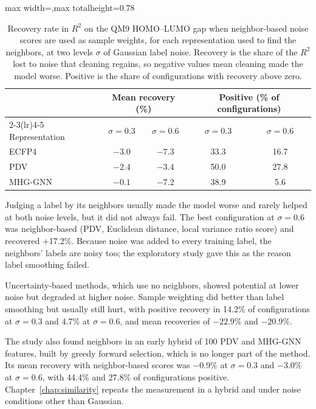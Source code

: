 \begin{table}[htbp]
\centering
\begin{adjustbox}{max width=\textwidth,max totalheight=0.78\textheight}
\begin{tabular}{lcccc}
\toprule
 & \multicolumn{2}{c}{Mean recovery (\%)} & \multicolumn{2}{c}{Positive (\% of configurations)} \\
\cmidrule(lr){2-3}\cmidrule(lr){4-5}
Representation & $\sigma = 0.3$ & $\sigma = 0.6$ & $\sigma = 0.3$ & $\sigma = 0.6$ \\
\midrule
ECFP4   & $-3.0$ & $-7.3$ & 33.3 & 16.7 \\
PDV     & $-2.4$ & $-3.4$ & 50.0 & 27.8 \\
MHG-GNN & $-0.1$ & $-7.2$ & 38.9 & 5.6 \\
\bottomrule
\end{tabular}
\end{adjustbox}
\caption[Recovery with neighbor-based sample weights by representation.]{Recovery rate in $R^2$ on the QM9 HOMO--LUMO gap when neighbor-based noise scores are used as sample weights, for each representation used to find the neighbors, at two levels $\sigma$ of Gaussian label noise. Recovery is the share of the $R^2$ lost to noise that cleaning regains, so negative values mean cleaning made the model worse. Positive is the share of configurations with recovery above zero.}
\label{tab:code_input_neighbor_recovery}
\end{table}

Judging a label by its neighbors usually made the model worse and rarely helped at both noise levels, but it did not always fail. The best configuration at $\sigma = 0.6$ was neighbor-based (PDV, Euclidean distance, local variance ratio score) and recovered +17.2\%. Because noise was added to every training label, the neighbors' labels are noisy too; the exploratory study gave this as the reason label smoothing failed.

Uncertainty-based methods, which use no neighbors, showed potential at lower noise but degraded at higher noise. Sample weighting did better than label smoothing but usually still hurt, with positive recovery in 14.2\% of configurations at $\sigma = 0.3$ and 4.7\% at $\sigma = 0.6$, and mean recoveries of $-22.9\%$ and $-20.9\%$.

The study also found neighbors in an early hybrid of 100 PDV and MHG-GNN features, built by greedy forward selection, which is no longer part of the method. Its mean recovery with neighbor-based scores was $-0.9\%$ at $\sigma = 0.3$ and $-3.0\%$ at $\sigma = 0.6$, with 44.4\% and 27.8\% of configurations positive. Chapter~\ref{chap:similarity} repeats the measurement in a hybrid and under noise conditions other than Gaussian.

